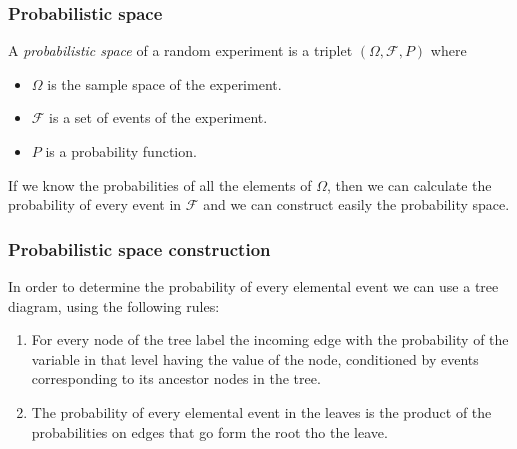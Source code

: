 \begin{frame}
\frametitle{Probabilistic space}
\begin{definition}
A \emph{probabilistic space} of a random experiment is a triplet $(\Omega,\mathcal{F},P)$ where
\begin{itemize}
\item $\Omega$ is the sample space of the experiment.
\item $\mathcal{F}$ is a set of events of the experiment.
\item $P$ is a probability function. 
\end{itemize} 
\end{definition}

If we know the probabilities of all the elements of $\Omega$, then we can calculate the probability of every event in
$\mathcal{F}$ and we can construct easily the probability space. 
\end{frame}


\begin{frame}
\frametitle{Probabilistic space construction}
In order to determine the probability of every elemental event we can use a tree diagram, using the following rules:
\begin{enumerate}
\item For every node of the tree label the incoming edge with the probability of the variable in that level having the
value of the node, conditioned by events corresponding to its ancestor nodes in the tree.
\item The probability of every elemental event in the leaves is the product of the probabilities on edges
that go form the root tho the leave.
\end{enumerate}
\begin{center}
\resizebox{0.8\textwidth}{!}{}
\end{center}
\end{frame}


